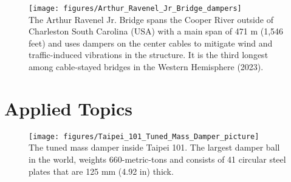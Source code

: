 \documentclass[12pt,letter]{article}
\begin{document}
\setcounter{page}{0}
\setcounter{secnumdepth}{3} %

\begin{figure}[H]
	\centering
	\texttt{[image: figures/Arthur\_Ravenel\_Jr\_Bridge\_dampers]} \\
	The Arthur Ravenel Jr. Bridge spans the Cooper River outside of Charleston South Carolina (USA) with a main span of 471 m (1,546 feet) and uses dampers on the center cables to mitigate wind and traffic-induced vibrations in the structure. It is the third longest among cable-stayed bridges in the Western Hemisphere (2023).
\end{figure}



\pagebreak

\graphicspath{{Chapter_1_fundamentals_of_vibrations/}} 










\part{Applied Topics}

\begin{figure}[H]
	\centering
	\texttt{[image: figures/Taipei\_101\_Tuned\_Mass\_Damper\_picture]} \\
	The tuned mass damper inside Taipei 101.  The largest damper ball in the world, weights 660-metric-tons and consists of 41 circular steel plates that are 125 mm (4.92 in) thick.  \protect\footnotemark[1]
\end{figure}








%
\end{document}
